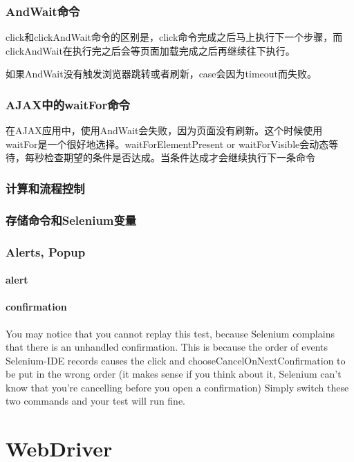 \subsubsection{AndWait命令}
click和clickAndWait命令的区别是，click命令完成之后马上执行下一个步骤，而clickAndWait在执行完之后会等页面加载完成之后再继续往下执行。

如果AndWait没有触发浏览器跳转或者刷新，case会因为timeout而失败。
\subsubsection{AJAX中的waitFor命令}
在AJAX应用中，使用AndWait会失败，因为页面没有刷新。这个时候使用waitFor是一个很好地选择。waitForElementPresent or waitForVisible会动态等待，每秒检查期望的条件是否达成。当条件达成才会继续执行下一条命令

\subsubsection{计算和流程控制}



\subsubsection{存储命令和Selenium变量}

\subsubsection{Alerts, Popup}

\paragraph{alert} 

\paragraph{confirmation} You may notice that you cannot replay this test, because Selenium complains that there is an unhandled confirmation. This is because the order of events Selenium-IDE records causes the click and chooseCancelOnNextConfirmation to be put in the wrong order (it makes sense if you think about it, Selenium can’t know that you’re cancelling before you open a confirmation) Simply switch these two commands and your test will run fine.

\section{WebDriver}

